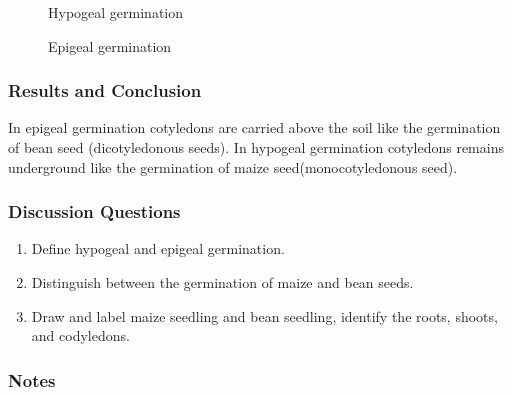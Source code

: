 \begin{figure}[h]
\begin{center}
\def\svgwidth{6cm}

\caption{Hypogeal germination}
\label{fig:hypogeal}
\end{center}
\end{figure}

\begin{figure}[h]
\begin{center}
\def\svgwidth{7cm}

\caption{Epigeal germination}
\label{fig:epigeal}
\end{center}
\end{figure}

\subsubsection*{Results and Conclusion}
In epigeal germination cotyledons are carried above the soil like the germination of bean seed (dicotyledonous seeds). In hypogeal germination cotyledons remains underground like the germination of maize seed(monocotyledonous seed).

\subsubsection*{Discussion Questions}
\begin{enumerate}
\item{Define hypogeal and epigeal germination.}
\item{Distinguish between the germination of maize and bean seeds.}
\item{Draw and label maize seedling and bean seedling, identify the roots, shoots, and codyledons.}
\end{enumerate}

\subsubsection*{Notes}
